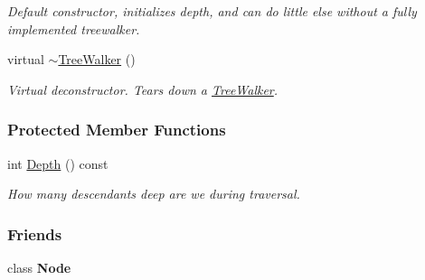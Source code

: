 \begin{DoxyCompactItemize}
\begin{DoxyCompactList}\small\item\em Default constructor, initializes depth, and can do little else without a fully implemented treewalker. \item\end{DoxyCompactList}\item 
\hypertarget{classphys_1_1xml_1_1TreeWalker_a84d0c68cf364a81e29f0cc321098ae28}{
virtual \hyperlink{classphys_1_1xml_1_1TreeWalker_a84d0c68cf364a81e29f0cc321098ae28}{$\sim$TreeWalker} ()}
\label{classphys_1_1xml_1_1TreeWalker_a84d0c68cf364a81e29f0cc321098ae28}

\begin{DoxyCompactList}\small\item\em Virtual deconstructor. Tears down a \hyperlink{classphys_1_1xml_1_1TreeWalker}{TreeWalker}. \item\end{DoxyCompactList}\end{DoxyCompactItemize}
\subsubsection*{Protected Member Functions}
\begin{DoxyCompactItemize}
\item 
int \hyperlink{classphys_1_1xml_1_1TreeWalker_a90fdd705ae4d5e8e3b931bb8896e4397}{Depth} () const 
\begin{DoxyCompactList}\small\item\em How many descendants deep are we during traversal. \item\end{DoxyCompactList}\end{DoxyCompactItemize}
\subsubsection*{Friends}
\begin{DoxyCompactItemize}
\item 
\hypertarget{classphys_1_1xml_1_1TreeWalker_a6db9d28bd448a131448276ee03de1e6d}{
class {\bfseries Node}}
\label{classphys_1_1xml_1_1TreeWalker_a6db9d28bd448a131448276ee03de1e6d}

\end{DoxyCompactItemize}


